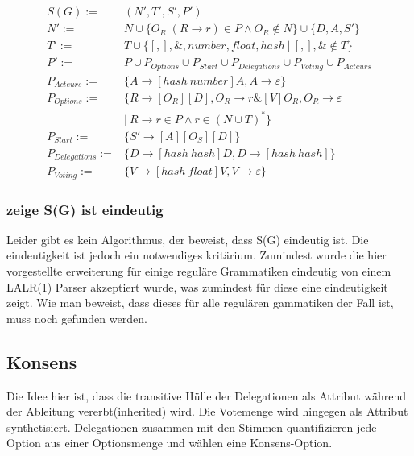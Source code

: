 \documentclass[]{article}
\begin{document}
\begin{align}
  S(G) :=& (N', T', S', P') \\
  N' :=& N \cup \{ O_R | (R\rightarrow r)\in P\land O_R \notin N\}\cup\{D, A, S'\}\\
  T' :=& T \cup \{[ , ], \&, number, float, hash\ |\ [,],\& \notin T \}\\
  P' :=& P
  \cup P_{Options} 
  \cup P_{Start} 
  \cup P_{Delegations} 
  \cup P_{Voting} 
  \cup P_{Acteurs}
  \\
  P_{Acteurs} :=& \{A\rightarrow[hash\ number]A,A\rightarrow \varepsilon\} \\
  P_{Options} :=& \{R \rightarrow [O_R][D], O_R \rightarrow r\& [V] O_R, O_R \rightarrow \varepsilon \ \nonumber\\
  &\vert\ R\rightarrow r\in P \land r\in (N\cup T)^*\} \\
  P_{Start} :=& \{S'\rightarrow [A][O_S][D]\} \\
  P_{Delegations} :=& \{D\rightarrow [hash\ hash]D,D\rightarrow [hash\ hash]\} \\
  P_{Voting} :=& \{V\rightarrow [hash\ float]V, V \rightarrow \varepsilon\}
\end{align}


\subsubsection*{zeige S(G) ist eindeutig}
Leider gibt es kein Algorithmus, der beweist, dass S(G) eindeutig ist. Die eindeutigkeit ist jedoch ein notwendiges kritärium. Zumindest wurde die hier vorgestellte erweiterung für einige reguläre Grammatiken eindeutig von einem LALR(1) Parser akzeptiert wurde, was zumindest für diese eine eindeutigkeit zeigt. Wie man beweist, dass dieses für alle regulären gammatiken der Fall ist, muss noch gefunden werden.

\subsection{Konsens}


Die Idee hier ist, dass die transitive Hülle der Delegationen als
Attribut während der Ableitung vererbt(inherited) wird. Die Votemenge
wird hingegen als Attribut synthetisiert.\cite{Knuth1968} Delegationen zusammen mit den Stimmen quantifizieren jede Option aus einer Optionsmenge und wählen
eine Konsens-Option.
\end{document}

